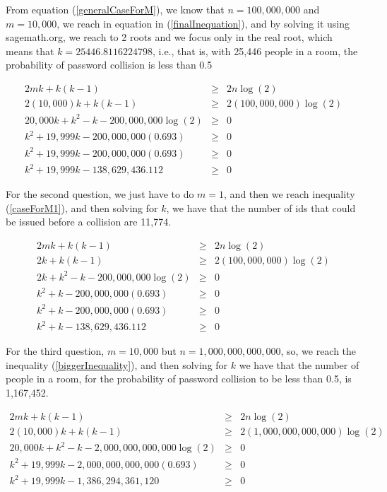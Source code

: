 \documentclass[tikz, 12pt]{scrartcl}
\begin{document}
\begin{enumerate}
	From equation (\ref{generalCaseForM}), we know that $n = 100,000,000$ and $m = 10,000$, we reach in equation in (\ref{finalInequation}), and by solving it using sagemath.org, we reach to 2 roots and we focus only in the real root, which means that $k = 25446.8116224798$, i.e., that is, with 25,446 people in a room, the probability of password collision is less than 0.5
	
	\begin{eqnarray}
	2mk + k(k - 1)						&	\geq	&	2n \log(2) \nonumber \\
	2(10,000)k + k(k - 1)					&	\geq	&	2(100,000,000) \log(2) \nonumber \\
	20,000k + k^2 - k - 200,000,000 \log(2)	&	\geq	& 	0 \nonumber \\
	k^2 + 19,999k - 200,000,000(0.693)		&	\geq	&	0 \nonumber \\
	k^2 + 19,999k - 200,000,000(0.693)		&	\geq	&	0 \nonumber \\
	k^2 + 19,999k - 138,629,436.112		&	\geq	&	0 \label{finalInequation}
	\end{eqnarray}
	
	For the second question, we just have to do $m = 1$, and then we reach inequality (\ref{caseForM1}), and then solving for $k$, we have that the number of ids that could be issued before a collision are 11,774.
	
	\begin{eqnarray}
	2mk + k(k - 1)						&	\geq	&	2n \log(2) \nonumber \\
	2k + k(k - 1)					&	\geq	&	2(100,000,000) \log(2) \nonumber \\
	2k + k^2 - k - 200,000,000 \log(2)	&	\geq	& 	0 \nonumber \\
	k^2 + k - 200,000,000(0.693)		&	\geq	&	0 \nonumber \\
	k^2 + k - 200,000,000(0.693)		&	\geq	&	0 \nonumber \\
	k^2 + k - 138,629,436.112		&	\geq	&	0 \label{caseForM1}
	\end{eqnarray}
	
	For the third question, $m = 10,000$ but $n = 1,000,000,000,000$, so, we reach the inequality (\ref{biggerInequality}), and then solving for $k$ we have that the number of people in a room, for the probability of password collision to be less than 0.5, is 1,167,452.
	
	\begin{eqnarray}
	2mk + k(k - 1)						&	\geq	&	2n \log(2) \nonumber \\
	2(10,000)k + k(k - 1)					&	\geq	&	2( 1,000,000,000,000) \log(2) \nonumber \\
	20,000k + k^2 - k -  2,000,000,000,000 \log(2)	&	\geq	& 	0 \nonumber \\
	k^2 + 19,999k -  2,000,000,000,000(0.693)		&	\geq	&	0 \nonumber \\
	k^2 + 19,999k - 1,386,294,361,120		&	\geq	&	0 \label{biggerInequality}
	\end{eqnarray}



\end{enumerate}
\end{document}
